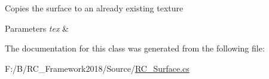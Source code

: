 Copies the surface to an already existing texture 


\begin{DoxyParams}{Parameters}
{\em tex} & \\
\hline
\end{DoxyParams}


The documentation for this class was generated from the following file\+:\begin{DoxyCompactItemize}
\item 
F\+:/\+B/\+R\+C\+\_\+\+Framework2018/\+Source/\mbox{\hyperlink{_r_c___surface_8cs}{R\+C\+\_\+\+Surface.\+cs}}\end{DoxyCompactItemize}
